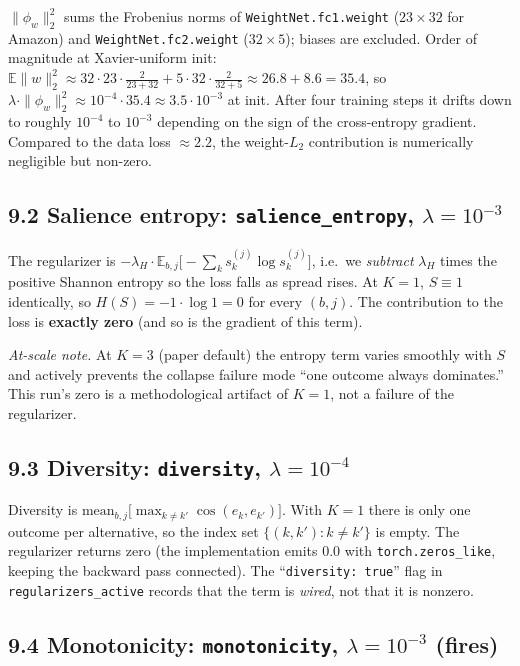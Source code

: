 \documentclass[11pt,a4paper]{article}
\begin{document}
$\|\phi_w\|_2^2$ sums the Frobenius norms of
\texttt{WeightNet.fc1.weight} ($23 \times 32$ for Amazon) and
\texttt{WeightNet.fc2.weight} ($32 \times 5$); biases are excluded.
Order of magnitude at Xavier-uniform init:
$\mathbb{E}\|w\|_2^2 \approx 32 \cdot 23 \cdot \frac{2}{23+32}
+ 5 \cdot 32 \cdot \frac{2}{32+5} \approx 26.8 + 8.6 = 35.4$,
so $\lambda \cdot \|\phi_w\|_2^2 \approx 10^{-4} \cdot 35.4
\approx 3.5 \cdot 10^{-3}$ at init. After four training steps it
drifts down to roughly $10^{-4}$ to $10^{-3}$ depending on the sign of
the cross-entropy gradient. Compared to the data loss $\approx 2.2$,
the weight-$L_2$ contribution is numerically negligible but non-zero.

\subsection*{9.2 Salience entropy: \texttt{salience\_entropy},
$\lambda = 10^{-3}$}

The regularizer is
$-\lambda_H \cdot \mathbb{E}_{b, j}\big[-\sum_k s_k^{(j)} \log s_k^{(j)}\big]$,
i.e.\ we \emph{subtract} $\lambda_H$ times the positive Shannon entropy
so the loss falls as spread rises. At $K = 1$, $S \equiv 1$
identically, so $H(S) = -1 \cdot \log 1 = 0$ for every $(b, j)$. The
contribution to the loss is \textbf{exactly zero} (and so is the
gradient of this term).

\emph{At-scale note.} At $K = 3$ (paper default) the entropy term
varies smoothly with $S$ and actively prevents the collapse failure
mode ``one outcome always dominates.'' This run's zero is a
methodological artifact of $K = 1$, not a failure of the regularizer.

\subsection*{9.3 Diversity: \texttt{diversity}, $\lambda = 10^{-4}$}

Diversity is
$\text{mean}_{b, j}\big[\max_{k \ne k'} \cos(e_k, e_{k'})\big]$.
With $K = 1$ there is only one outcome per alternative, so the index
set $\{(k, k') : k \ne k'\}$ is empty. The regularizer returns zero
(the implementation emits $0.0$ with \texttt{torch.zeros\_like},
keeping the backward pass connected). The ``\texttt{diversity: true}''
flag in \texttt{regularizers\_active} records that the term is
\emph{wired}, not that it is nonzero.

\subsection*{9.4 Monotonicity: \texttt{monotonicity},
$\lambda = 10^{-3}$ (\textbf{fires})}
\end{document}
